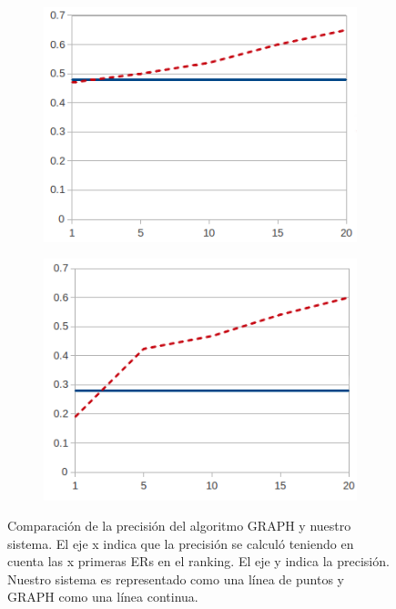 \begin{figure}[h]
\begin{subfigure}{.6\textwidth}
  \centering
\includegraphics[width=\textwidth]{images/furniturePrec.png}
\caption{}
\end{subfigure}
  \centering
\begin{subfigure}{.6\textwidth}
\centering
\includegraphics[width=\textwidth]{images/precP.png}
\caption{}
\end{subfigure}
\caption{Comparaci\'on de la precisi\'on  del algoritmo GRAPH y nuestro sistema. El eje x indica que la precisi\'on se calcul\'o teniendo en cuenta las x primeras ERs en el ranking. El eje y indica la precisi\'on. Nuestro sistema es representado como una l\'inea de puntos y GRAPH como una l\'inea continua.\label{graficoPresicion}}
\end{figure}


